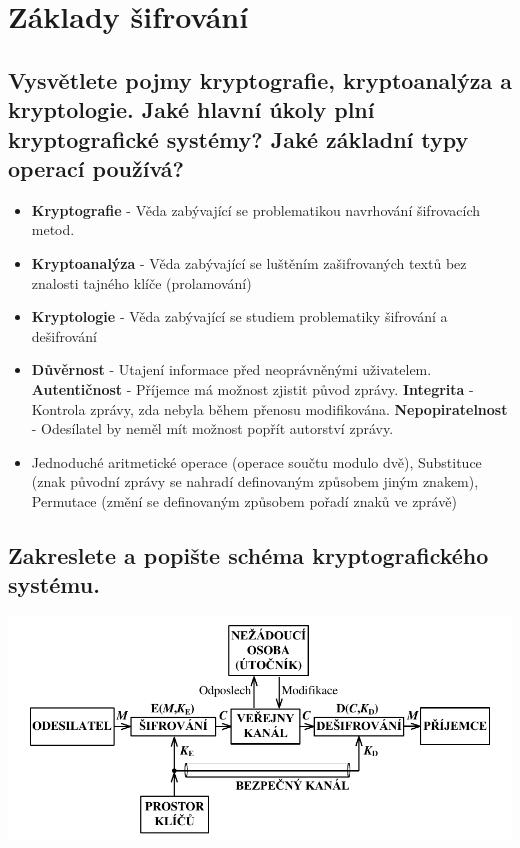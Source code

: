 \clearpage
\section{Základy šifrování}
\subsection{Vysvětlete pojmy kryptografie, kryptoanalýza a kryptologie. Jaké hlavní úkoly plní kryptografické systémy? Jaké základní typy operací používá?}
\begin{itemize}
    \item \textbf{Kryptografie} - Věda zabývající se problematikou navrhování šifrovacích metod.
    \item \textbf{Kryptoanalýza} - Věda zabývající se luštěním zašifrovaných textů bez znalosti tajného klíče (prolamování)
    \item \textbf{Kryptologie} - Věda zabývající se studiem problematiky šifrování a dešifrování
    \item \textbf{Důvěrnost} - Utajení informace před neoprávněnými uživatelem. \textbf{Autentičnost} - Příjemce má možnost zjistit původ zprávy. \textbf{Integrita} - Kontrola zprávy, zda nebyla během přenosu modifikována. \textbf{Nepopiratelnost} - Odesílatel by neměl mít možnost popřít autorství zprávy.
    \item Jednoduché aritmetické operace (operace součtu modulo dvě), Substituce (znak původní zprávy se nahradí definovaným způsobem jiným znakem), Permutace (změní se definovaným způsobem pořadí znaků ve zprávě)
\end{itemize}

\subsection{Zakreslete a popište schéma kryptografického systému.}
\includegraphics[width=16cm]{images/12_schema.png}

